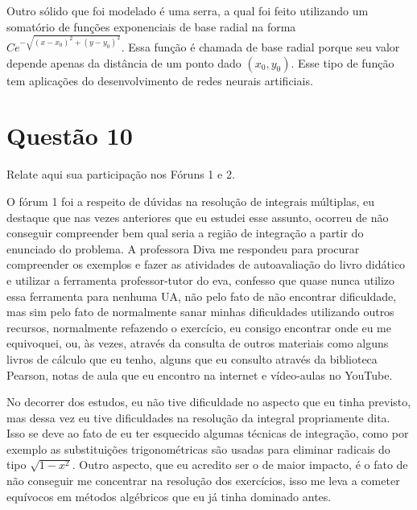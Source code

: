 \documentclass[10pt,a4paper]{article}
\begin{document}
	Outro sólido que foi modelado é uma serra, a qual foi feito utilizando um somatório de funções exponenciais de base radial na forma $ Ce^{-\sqrt{(x-x_0)^2 + (y-y_0)^2}} $. Essa função é chamada de base radial porque seu valor depende apenas da distância de um ponto dado $(x_0, y_0)$. Esse tipo de função tem aplicações do desenvolvimento de redes neurais artificiais.
	
	\section*{Questão 10}
	
	Relate aqui sua participação nos Fóruns 1 e 2.
	
	O fórum 1 foi a respeito de dúvidas na resolução de integrais múltiplas, eu destaque que nas vezes anteriores que eu estudei esse assunto, ocorreu de não conseguir compreender bem qual seria a região de integração a partir do enunciado do problema. A professora Diva me respondeu para procurar compreender os exemplos e fazer as atividades de autoavaliação do livro didático e utilizar a ferramenta professor-tutor do eva, confesso que quase nunca utilizo essa ferramenta para nenhuma UA, não pelo fato de não encontrar dificuldade, mas sim pelo fato de normalmente sanar minhas dificuldades utilizando outros recursos, normalmente refazendo o exercício, eu consigo encontrar onde eu me equivoquei, ou, às vezes, através da consulta de outros materiais como alguns livros de cálculo que eu tenho, alguns que eu consulto através da biblioteca Pearson, notas de aula que eu encontro na internet e vídeo-aulas no YouTube.
	
	No decorrer dos estudos, eu não tive dificuldade no aspecto que eu tinha previsto, mas dessa vez eu tive dificuldades na resolução da integral propriamente dita. Isso se deve ao fato de eu ter esquecido algumas técnicas de integração, como por exemplo as substituições trigonométricas são usadas para eliminar radicais do tipo $\sqrt{1 - x^2}$. Outro aspecto, que eu acredito ser o de maior impacto, é o fato de não conseguir me concentrar na resolução dos exercícios, isso me leva a cometer equívocos em métodos algébricos que eu já tinha dominado antes.
	
	
\end{document}
